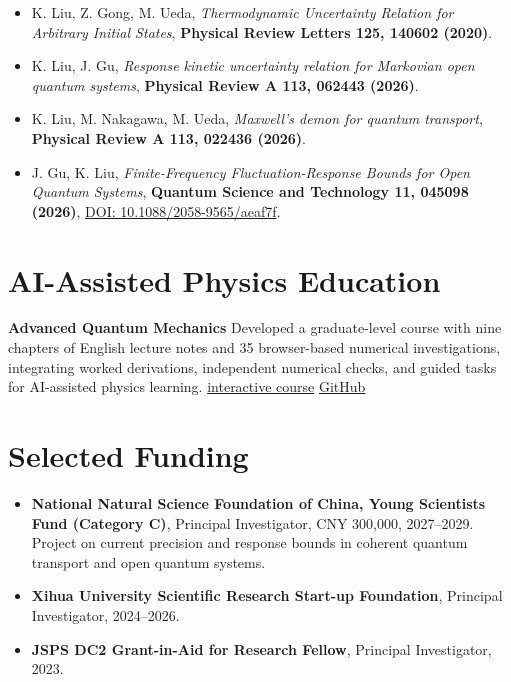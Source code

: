 \documentclass[10pt,a4paper]{article}
\newcommand{\paper}[1]{\textit{#1}}
\newcommand{\link}[2]{\href{#1}{#2}}
\begin{document}
\begin{itemize}
  \item K. Liu, Z. Gong, M. Ueda, \paper{Thermodynamic Uncertainty Relation for Arbitrary Initial States}, \textbf{Physical Review Letters 125, 140602 (2020)}.
  \item K. Liu, J. Gu, \paper{Response kinetic uncertainty relation for Markovian open quantum systems}, \textbf{Physical Review A 113, 062443 (2026)}.
  \item K. Liu, M. Nakagawa, M. Ueda, \paper{Maxwell's demon for quantum transport}, \textbf{Physical Review A 113, 022436 (2026)}.
  \item J. Gu, K. Liu, \paper{Finite-Frequency Fluctuation-Response Bounds for Open Quantum Systems}, \textbf{Quantum Science and Technology 11, 045098 (2026)}, \href{https://doi.org/10.1088/2058-9565/aeaf7f}{DOI: 10.1088/2058-9565/aeaf7f}.
\end{itemize}

\section*{AI-Assisted Physics Education}
\textbf{Advanced Quantum Mechanics}
Developed a graduate-level course with nine chapters of English lecture notes and 35 browser-based numerical investigations, integrating worked derivations, independent numerical checks, and guided tasks for AI-assisted physics learning.
\link{https://kangqiaoliu.github.io/courses/advanced-quantum-mechanics/companion/}{interactive course} \;\; \link{https://github.com/KangqiaoLiu/advanced-quantum-mechanics-lecture-note}{GitHub}

\section*{Selected Funding}
\begin{itemize}
  \item \textbf{National Natural Science Foundation of China, Young Scientists Fund (Category C)}, Principal Investigator, CNY 300,000, 2027--2029. Project on current precision and response bounds in coherent quantum transport and open quantum systems.
  \item \textbf{Xihua University Scientific Research Start-up Foundation}, Principal Investigator, 2024--2026.
  \item \textbf{JSPS DC2 Grant-in-Aid for Research Fellow}, Principal Investigator, 2023.
\end{itemize}
\end{document}

